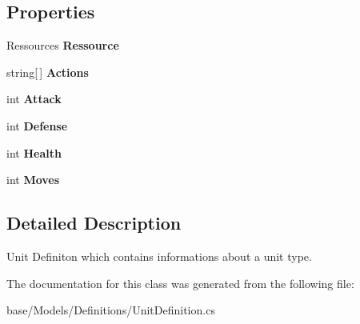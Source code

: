 \subsection*{Properties}
\begin{DoxyCompactItemize}
\item 
\hypertarget{classCore_1_1Models_1_1Definitions_1_1UnitDefinition_a22944789885c1239e3d91559e6851c1b}{Ressources {\bfseries Ressource}}\label{classCore_1_1Models_1_1Definitions_1_1UnitDefinition_a22944789885c1239e3d91559e6851c1b}

\item 
\hypertarget{classCore_1_1Models_1_1Definitions_1_1UnitDefinition_a5fe8e6ee0edb611becffc14e79326797}{string\mbox{[}$\,$\mbox{]} {\bfseries Actions}}\label{classCore_1_1Models_1_1Definitions_1_1UnitDefinition_a5fe8e6ee0edb611becffc14e79326797}

\item 
\hypertarget{classCore_1_1Models_1_1Definitions_1_1UnitDefinition_aa796297ed1001668bc576763a1491c31}{int {\bfseries Attack}}\label{classCore_1_1Models_1_1Definitions_1_1UnitDefinition_aa796297ed1001668bc576763a1491c31}

\item 
\hypertarget{classCore_1_1Models_1_1Definitions_1_1UnitDefinition_a19782c411903ddedb9a3d35fc2afee55}{int {\bfseries Defense}}\label{classCore_1_1Models_1_1Definitions_1_1UnitDefinition_a19782c411903ddedb9a3d35fc2afee55}

\item 
\hypertarget{classCore_1_1Models_1_1Definitions_1_1UnitDefinition_ae0a91bec79fd1a79137e5c27668bd089}{int {\bfseries Health}}\label{classCore_1_1Models_1_1Definitions_1_1UnitDefinition_ae0a91bec79fd1a79137e5c27668bd089}

\item 
\hypertarget{classCore_1_1Models_1_1Definitions_1_1UnitDefinition_a0fe401df39765664e20eb9b1d3df4c06}{int {\bfseries Moves}}\label{classCore_1_1Models_1_1Definitions_1_1UnitDefinition_a0fe401df39765664e20eb9b1d3df4c06}

\end{DoxyCompactItemize}


\subsection{Detailed Description}
Unit Definiton which contains informations about a unit type. 



The documentation for this class was generated from the following file\-:\begin{DoxyCompactItemize}
\item 
base/\-Models/\-Definitions/Unit\-Definition.\-cs\end{DoxyCompactItemize}
